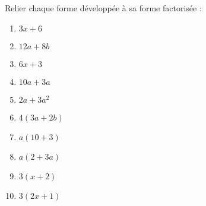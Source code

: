 
\begin{exercice}\label{exo2smath-0102}

    \let\oldtheenumi\theenumi
    Relier chaque forme développée à sa forme factorisée :
    \begin{multicols}{2}
        \begin{enumerate}
                \renewcommand{\theenumi}{(\alph{enumi})}
            \item
                \( 3x+6\)
            \item
                \( 12a+8b\)
            \item
                \( 6x+3\)
            \item
                \( 10a+3a\)
            \item
                \( 2a+3a^2\)
                \columnbreak
                \setcounter{enumi}{0}
                \renewcommand{\theenumi}{(\arabic{enumi})}
            \item
                \( 4(3a+2b)\)
            \item
                \( a(10+3)\)
            \item
                \( a(2+3a)\)
            \item
                \( 3(x+2)\)
            \item
                \( 3(2x+1)\)
        \end{enumerate}
    \end{multicols}
    \let\theenumi\oldtheenumi

\end{exercice}
